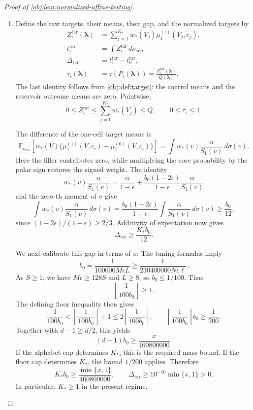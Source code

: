 \documentclass[11pt]{article}
\begin{document}
\begin{proof}[Proof of \cref{obj:lem:normalized-affine-testing}]
\begin{enumerate}
\item
Define the raw targets, their means, their gap, and the normalized targets by
\[
\begin{aligned}
Z_\iota^{\mathrm{tar}}(\boldsymbol\lambda)
&=\sum_{j=1}^{K_*}w_*(V_j)\mu_1^{(\iota)}(V_j,c_j),\\
t_\iota^{\mathrm{tar}}
&=\int Z_\iota^{\mathrm{tar}}\,d\nu_{\mathrm{lat}},\\
\Delta_{\mathrm{tar}}&=t_1^{\mathrm{tar}}-t_0^{\mathrm{tar}},\\
\tau_\iota(\boldsymbol\lambda)
&=\tau(P_\iota(\boldsymbol\lambda))
=\frac{Z_\iota^{\mathrm{tar}}(\boldsymbol\lambda)}{Q(\boldsymbol\lambda)}.
\end{aligned}
\]
The last identity follows from \cref{obj:def:target}: the control means and the reservoir outcome means are zero. Pointwise,
\[
0\le Z_\iota^{\mathrm{tar}}
\le\sum_{j=1}^{K_*}w_*(V_j)\le Q,
\qquad
0\le\tau_\iota\le1.
\]

The difference of the one-cell target means is
\[
\mathbb E_{\nu_{\mathrm{cell}}}
\left[w_*(V)\{\mu_1^{(1)}(V,c_i)-\mu_1^{(0)}(V,c_i)\}\right]
=\int w_*(v)\frac{\alpha}{S_1(v)}\,d\sigma(v).
\]
Here the filler contributes zero, while multiplying the core probability by the polar sign restores the signed weight. The identity
\[
w_*(v)\frac{\alpha}{S_1(v)}
=\frac{\alpha}{1-\epsilon}
+\frac{b_0(1-2\epsilon)}{1-\epsilon}
  \frac{\alpha}{S_1(v)}
\]
and the zero-th moment of \(\sigma\) give
\[
\int w_*(v)\frac{\alpha}{S_1(v)}\,d\sigma(v)
=\frac{b_0(1-2\epsilon)}{1-\epsilon}
 \int\frac{\alpha}{S_1(v)}\,d\sigma(v)
\ge\frac{b_0}{12},
\]
since \((1-2\epsilon)/(1-\epsilon)\ge2/3\). Additivity of expectation now gives
\[
\Delta_{\mathrm{tar}}\ge\frac{K_*b_0}{12}.
\]

We next calibrate this gap in terms of \(x\). The tuning formulas imply
\[
b_0=\frac1{100000M\epsilon L}
\ge\frac1{230400000N\epsilon\ell}.
\]
As \(S\ge1\), we have \(M\epsilon\ge128S\) and \(L\ge8\), so \(b_0\le1/100\). Thus
\[
\left\lfloor\frac1{100b_0}\right\rfloor\ge1.
\]
The defining floor inequality then gives
\[
\frac1{100b_0}
<
\left\lfloor\frac1{100b_0}\right\rfloor+1
\le2\left\lfloor\frac1{100b_0}\right\rfloor,
\qquad
\left\lfloor\frac1{100b_0}\right\rfloor b_0\ge\frac1{200}.
\]
Together with \(d-1\ge d/2\), this yields
\[
(d-1)b_0\ge\frac{x}{460800000}.
\]
If the alphabet cap determines \(K_*\), this is the required mass bound. If the floor cap determines \(K_*\), the bound \(1/200\) applies. Therefore
\[
K_*b_0\ge\frac{\min\{x,1\}}{460800000},
\qquad
\Delta_{\mathrm{tar}}\ge10^{-10}\min\{x,1\}>0.
\]
In particular, \(K_*\ge1\) in the present regime.


\end{enumerate}
\end{proof}
\end{document}
